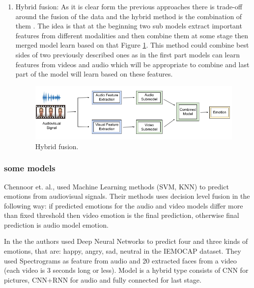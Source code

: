 \documentclass[oneside]{report}
\begin{document}
\begin{enumerate}
        \item Hybrid fusion: As it is clear form the previous approaches there is trade-off around the fusion of the data and the hybrid method is the combination of them \cite{china_2020, stanford_2020, waterloo_2019, estonia_2018, stuttgart_2021, china_2020_1, india_2014}. The idea is that at the beginning two sub models extract important features from different modalities and then combine them at some stage then merged model learn based on that Figure \ref{fig:hf}. This method could combine best sides of two previously described ones as in the first part models can learn features from videos and audio which will be appropriate to combine and last part of the model will learn based on these features.  
        
        \begin{figure}[H]
        \centering
        \includegraphics[scale=0.6]{hf.png}
        \caption{Hybrid fusion.}
        \label{fig:hf}
        \end{figure}
        
    \end{enumerate}

    \subsubsection{some models}
    Chennoor et. al., \cite{india_2020} used Machine Learning methods (SVM, KNN) to predict emotions from audiovisual signals. Their methods uses decision level fusion in the following way: if predicted emotions for the audio and video models differ more than fixed threshold then video emotion is the final prediction, otherwise final prediction is audio model emotion. 
    
    In the \cite{stanford_2020} the authors used Deep Neural Networks to predict four and three kinds of emotions, that are: happy, angry, sad, neutral in the IEMOCAP \cite{iemocap} dataset. They used Spectrograms as feature from audio and 20 extracted faces from a video (each video is 3 seconds long or less). Model is a hybrid type consists of CNN for pictures, CNN+RNN for audio and fully connected for last stage. 
    
\end{document}

